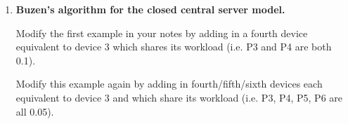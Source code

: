 \begin{enumerate}
\begin{itemize}
\item from node 1, jobs go to node 3 with probability 0.3 
and to node 4 with probability 0.7

\item from node 2, jobs go to node 3 with probability 0.7 
and to node 4 with probability 0.3

\item from node 3, jobs go back to node 1 with probability 0.8 
and leave the network with probability 0.2 

\item from node 4, jobs go back to node 2 with probability 0.8 
and leave the network with probability 0.2 

\end{itemize}

\begin{enumerate}

\item Draw a picture of the network showing the four nodes
and the flows amongst them

\item Write down the flow rate equations for each node

\item Show that

\begin{center}
$\Lambda_1$ + $\Lambda_2$ =  $\Lambda_3$ + $\Lambda_4$ = 5$\times$$\lambda$
\end{center}

where $\Lambda_1$, $\Lambda_2$, $\Lambda_3$, and $\Lambda_4$ 
are the actual flow rates at the 4 nodes respectively


\item ... and hence that $\Lambda_1$ = $\Lambda_2$ =  $\Lambda_3$ = $\Lambda_4$


\item If the average service times are all equal, give 
and justify an upper bound for the $\Lambda_k$.

\end{enumerate}

\newpage

\item {\bf Buzen's algorithm for the closed central server model.}

Modify the first example in your notes by 
adding in a fourth device equivalent to device 3 
which shares its workload (i.e. P3  and P4 are both 0.1).

Modify this example again by 
adding in fourth/fifth/sixth devices
each equivalent to device 3 and which share its workload 
(i.e. P3, P4, P5, P6 are all 0.05).

\end{enumerate}

